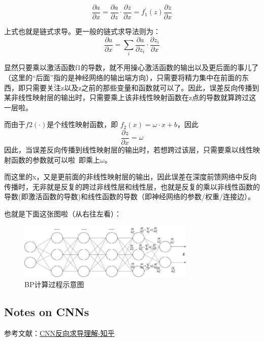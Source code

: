 \begin{displaymath}
\frac{\partial a}{\partial x} = \frac{\partial a}{\partial z}\cdot \frac{\partial z}{\partial x} = f_1^{'}(z)\frac{\partial z}{\partial x}
\end{displaymath}

上式也就是链式求导。更一般的链式求导法则为：
\begin{displaymath}
\frac{\partial a}{\partial x} = \sum_{i} \frac{\partial a}{\partial z_i}\cdot \frac{\partial z_i}{\partial x}
\end{displaymath}

显然只要乘以激活函数f1的导数，就不用操心激活函数的输出以及更后面的事儿了（这里的“后面”指的是神经网络的输出端方向），只需要将精力集中在前面的东西，即只需要关注z以及z之前的那些变量和函数就可以了。因此，误差反向传播到某非线性映射层的输出时，只需要乘上该非线性映射函数在z点的导数就算跨过这一层啦。

而由于$f2(\cdot)$是个线性映射函数，即 $f_2(x)=\omega \cdot x + b$，因此
\begin{displaymath}
\frac{\partial z}{\partial x} = \omega
\end{displaymath}
因此，当误差反向传播到线性映射层的输出时，若想跨过该层，只需要乘以线性映射函数的参数就可以啦~即乘上$\omega$。

而这里的x，又是更前面的非线性映射层的输出，因此误差在深度前馈网络中反向传播时，无非就是反复的跨过非线性层和线性层，也就是反复的乘以非线性函数的导数(即激活函数的导数)和线性函数的导数（即神经网络的参数/权重/连接边）。

也就是下面这张图啦（从右往左看）：

\begin{figure}[!bthp]
\centering
\includegraphics[width=0.75\textwidth]{DLTips/BP0.jpg}
\caption{BP计算过程示意图}
\label{BP0}
\end{figure}

\subsection{Notes on CNNs}

参考文献：\href{https://zhuanlan.zhihu.com/p/29458808}{CNN反向求导理解-知乎}

